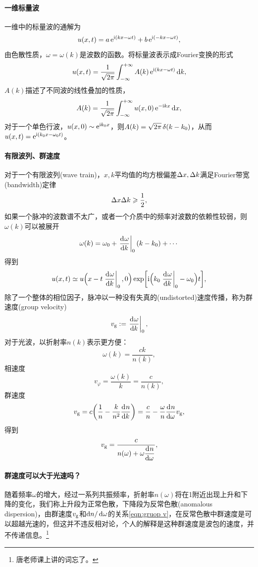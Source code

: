 \paragraph{一维标量波}

一维中的标量波的通解为
\[
    u(x,t)=a\mathop{}\!\mathrm{e}^{\mathrm{i}(kx-\omega t)}+b\mathop{}\!\mathrm{e}^{\mathrm{i}(-kx-\omega t)},
\]
由色散性质，$\omega=\omega(k)$是波数的函数。将标量波表示成Fourier变换的形式
\[
    u(x,t)=\frac1{\sqrt{2\pi}}\int_{-\infty}^{+\infty} A(k)\mathop{}\!\mathrm{e}^{\mathrm{i}(kx-\omega t)}\mathop{}\!\mathrm{d} k,
\]
$A(k)$描述了不同波的线性叠加的性质，
\[
    A(k)=\frac1{\sqrt{2\pi}}\int_{-\infty}^{+\infty} u(x,0)\mathop{}\!\mathrm{e}^{-\mathrm{i} kx}\mathop{}\!\mathrm{d} x,
\]
对于一个单色行波，$u(x,0)\sim\mathop{}\!\mathrm{e}^{\mathrm{i} k_0x}$，则$A(k)=\sqrt{2\pi}\mathop{}\!\delta(k-k_0)$，从而$u(x,t)=\mathop{}\!\mathrm{e}^{\mathrm{i}(k_0x-\omega_0t)}$。

\paragraph{有限波列、群速度}

对于一个有限波列(wave train)，$x,k$平均值的均方根偏差$\Delta x,\Delta k$满足Fourier带宽(bandwidth)定律
\begin{equation}
    \Delta x\Delta k\geqslant\frac12,
\end{equation}
如果一个脉冲的波数谱不太广，或者一个介质中的频率对波数的依赖性较弱，则$\omega(k)$可以被展开
\[
    \omega(k)=\omega_0+\left.\frac{\mathrm{d}^{{}}\omega}{\mathrm{d}{k}^{{}}}\right\rvert_0(k-k_0)+\cdots
\]
得到 
\[
    u(x,t)\simeq u\Bigl(x-t\left.\frac{\mathrm{d}^{{}}\omega}{\mathrm{d}{k}^{{}}}\right\rvert_0,0\Bigr)\exp\biggl[\mathrm{i}\Bigl(k_0\left.\frac{\mathrm{d}^{{}}\omega}{\mathrm{d}{k}^{{}}}\right\rvert_0-\omega_0\Bigr)t\biggr],
\]
除了一个整体的相位因子，脉冲以一种没有失真的(undistorted)速度传播，称为群速度(group velocity)
\begin{equation}
    v_\text g:=\left.\frac{\mathrm{d}^{{}}\omega}{\mathrm{d}{k}^{{}}}\right\rvert_0,
\end{equation}
对于光波，以折射率$n(k)$表示更方便：
\[
    \omega(k)=\frac{ck}{n(k)},
\]
相速度
\[
    v_\varphi=\frac{\omega(k)}k=\frac c{n(k)},
\]
群速度
\[
    v_\text g=c\biggl(\frac1n-\frac k{n^2}\frac{\mathrm{d}^{{}}n}{\mathrm{d}{k}^{{}}}\biggr)=\frac cn-\frac\omega n\frac{\mathrm{d}^{{}}n}{\mathrm{d}{\omega}^{{}}} v_\text g,
\]
得到 
\begin{equation}
    \label{eqn:gruop v}
    v_\text g=\frac c{\displaystyle n(\omega)+\omega\frac{\mathrm{d}^{{}}n}{\mathrm{d}{\omega}^{{}}}},
\end{equation}

\paragraph{群速度可以大于光速吗？}

随着频率$\omega$的增大，经过一系列共振频率，折射率$n(\omega)$将在1附近出现上升和下降的变化，我们称上升段为正常色散，下降段为反常色散(anomalous dispersion)，由群速度$v_\text g$和$\mathop{}\!\mathrm{d} n/\mathop{}\!\mathrm{d}\omega$的关系\eqref{eqn:gruop v}，在反常色散中群速度是可以超越光速的，但这并不违反相对论，个人的解释是这种群速度是波包的速度，并不传递信息。\footnote{唐老师课上讲的词忘了。}


